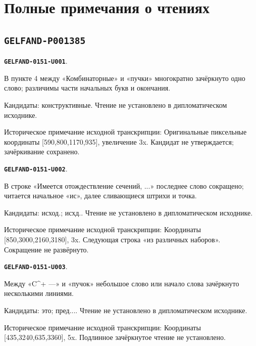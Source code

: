 \documentclass[11pt]{article}
\theoremstyle{definition}
\theoremstyle{remark}
\begin{document}
\clearpage\section*{Полные примечания о чтениях}
\subsection*{\texttt{GELFAND-P001385}}
\par\noindent\leavevmode{}\label{GELFAND-0151-U001}\label{GELFAND-P001385:cancelled-upper:note}\textbf{\texttt{GELFAND-0151-U001}}.\nopagebreak[4]\par
В пункте 4 между «Комбинаторные» и «пучки» многократно зачёркнуто одно слово; различимы части начальных букв и окончания.\par
Кандидаты: конструктивные. Чтение не установлено в дипломатическом исходнике.\par
Историческое примечание исходной транскрипции: Оригинальные пиксельные координаты [590,800,1170,935], увеличение 3x. Кандидат не утверждается; зачёркивание сохранено.\par\medskip
\par\noindent\leavevmode{}\label{GELFAND-0151-U002}\label{GELFAND-P001385:lower-gluing:note}\textbf{\texttt{GELFAND-0151-U002}}.\nopagebreak[4]\par
В строке «Имеется отождествление сечений, ...» последнее слово сокращено; читается начальное «ис», далее сливающиеся штрихи и точка.\par
Кандидаты: исход.; исхд.. Чтение не установлено в дипломатическом исходнике.\par
Историческое примечание исходной транскрипции: Координаты [850,3000,2160,3180], 3x. Следующая строка «из различных наборов». Сокращение не развёрнуто.\par\medskip
\par\noindent\leavevmode{}\label{GELFAND-0151-U003}\label{GELFAND-P001385:cancelled-bottom:note}\textbf{\texttt{GELFAND-0151-U003}}.\nopagebreak[4]\par
Между «C\textasciicircum{}+ —» и «пучок» небольшое слово или начало слова зачёркнуто несколькими линиями.\par
Кандидаты: это; пред.... Чтение не установлено в дипломатическом исходнике.\par
Историческое примечание исходной транскрипции: Координаты [435,3240,635,3360], 5x. Подлинное зачёркнутое чтение не установлено.\par\medskip
\end{document}

